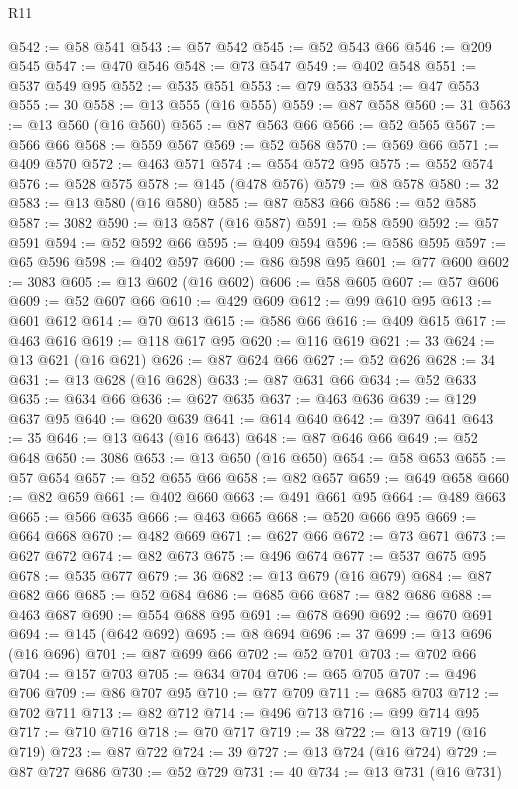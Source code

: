 \begin{lexlean}{R11}
\begin{coremodule}
@542 := @58 @541
@543 := @57 @542
@545 := @52 @543 @66
@546 := @209 @545
@547 := @470 @546
@548 := @73 @547
@549 := @402 @548
@551 := @537 @549 @95
@552 := @535 @551
@553 := @79 @533
@554 := @47 @553
@555 := 30
@558 := @13 @555 (@16 @555)
@559 := @87 @558
@560 := 31
@563 := @13 @560 (@16 @560)
@565 := @87 @563 @66
@566 := @52 @565
@567 := @566 @66
@568 := @559 @567
@569 := @52 @568
@570 := @569 @66
@571 := @409 @570
@572 := @463 @571
@574 := @554 @572 @95
@575 := @552 @574
@576 := @528 @575
@578 := @145 (@478 @576)
@579 := @8 @578
@580 := 32
@583 := @13 @580 (@16 @580)
@585 := @87 @583 @66
@586 := @52 @585
@587 := 3082
@590 := @13 @587 (@16 @587)
@591 := @58 @590
@592 := @57 @591
@594 := @52 @592 @66
@595 := @409 @594
@596 := @586 @595
@597 := @65 @596
@598 := @402 @597
@600 := @86 @598 @95
@601 := @77 @600
@602 := 3083
@605 := @13 @602 (@16 @602)
@606 := @58 @605
@607 := @57 @606
@609 := @52 @607 @66
@610 := @429 @609
@612 := @99 @610 @95
@613 := @601 @612
@614 := @70 @613
@615 := @586 @66
@616 := @409 @615
@617 := @463 @616
@619 := @118 @617 @95
@620 := @116 @619
@621 := 33
@624 := @13 @621 (@16 @621)
@626 := @87 @624 @66
@627 := @52 @626
@628 := 34
@631 := @13 @628 (@16 @628)
@633 := @87 @631 @66
@634 := @52 @633
@635 := @634 @66
@636 := @627 @635
@637 := @463 @636
@639 := @129 @637 @95
@640 := @620 @639
@641 := @614 @640
@642 := @397 @641
@643 := 35
@646 := @13 @643 (@16 @643)
@648 := @87 @646 @66
@649 := @52 @648
@650 := 3086
@653 := @13 @650 (@16 @650)
@654 := @58 @653
@655 := @57 @654
@657 := @52 @655 @66
@658 := @82 @657
@659 := @649 @658
@660 := @82 @659
@661 := @402 @660
@663 := @491 @661 @95
@664 := @489 @663
@665 := @566 @635
@666 := @463 @665
@668 := @520 @666 @95
@669 := @664 @668
@670 := @482 @669
@671 := @627 @66
@672 := @73 @671
@673 := @627 @672
@674 := @82 @673
@675 := @496 @674
@677 := @537 @675 @95
@678 := @535 @677
@679 := 36
@682 := @13 @679 (@16 @679)
@684 := @87 @682 @66
@685 := @52 @684
@686 := @685 @66
@687 := @82 @686
@688 := @463 @687
@690 := @554 @688 @95
@691 := @678 @690
@692 := @670 @691
@694 := @145 (@642 @692)
@695 := @8 @694
@696 := 37
@699 := @13 @696 (@16 @696)
@701 := @87 @699 @66
@702 := @52 @701
@703 := @702 @66
@704 := @157 @703
@705 := @634 @704
@706 := @65 @705
@707 := @496 @706
@709 := @86 @707 @95
@710 := @77 @709
@711 := @685 @703
@712 := @702 @711
@713 := @82 @712
@714 := @496 @713
@716 := @99 @714 @95
@717 := @710 @716
@718 := @70 @717
@719 := 38
@722 := @13 @719 (@16 @719)
@723 := @87 @722
@724 := 39
@727 := @13 @724 (@16 @724)
@729 := @87 @727 @686
@730 := @52 @729
@731 := 40
@734 := @13 @731 (@16 @731)

\end{coremodule}
\end{lexlean}
